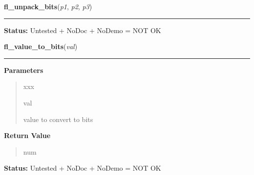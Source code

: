     \vspace{0.5ex}

\hspace{.8\funcindent}\begin{boxedminipage}{\funcwidth}

    \raggedright \textbf{fl\_unpack\_bits}(\textit{p1}, \textit{p2}, \textit{p3})

    \vspace{-1.5ex}

    \rule{\textwidth}{0.5\fboxrule}
\setlength{\parskip}{2ex}
\setlength{\parskip}{1ex}
\textbf{Status:} Untested + NoDoc + NoDemo = NOT OK



    \end{boxedminipage}

    \label{xformslib:library:fl_value_to_bits}

    \vspace{0.5ex}

\hspace{.8\funcindent}\begin{boxedminipage}{\funcwidth}

    \raggedright \textbf{fl\_value\_to\_bits}(\textit{val})

    \vspace{-1.5ex}

    \rule{\textwidth}{0.5\fboxrule}
\setlength{\parskip}{2ex}
\setlength{\parskip}{1ex}
      \textbf{Parameters}
      \vspace{-1ex}

      \begin{quote}
        \begin{Ventry}{xxx}

          \item[val]

          value to convert to bits

        \end{Ventry}

      \end{quote}

      \textbf{Return Value}
    \vspace{-1ex}

      \begin{quote}
      num

      \end{quote}

\textbf{Status:} Untested + NoDoc + NoDemo = NOT OK



    \end{boxedminipage}

